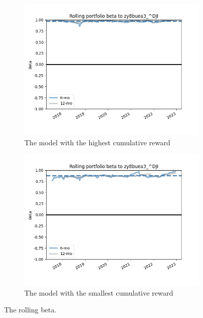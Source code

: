 \documentclass[../xlapes02]{subfiles}
\begin{document}
    \begin{figure}[h!]
        \centering
        \begin{subfigure}[b]{\experimentimgwidth\textwidth}
            \centering
            \includegraphics[width=\linewidth]{image/figure/rolling_beta_max}
            \caption{The model with the highest cumulative reward}
        \end{subfigure}
        \hfill
        \begin{subfigure}{\experimentimgwidth\textwidth}
            \centering
            \includegraphics[width=\linewidth]{image/figure/rolling_beta_min}
            \caption{The model with the smallest cumulative reward}
        \end{subfigure}
        \caption{The rolling beta.}
        \label{fig:Rolling Beta}
    \end{figure}
\end{document}
